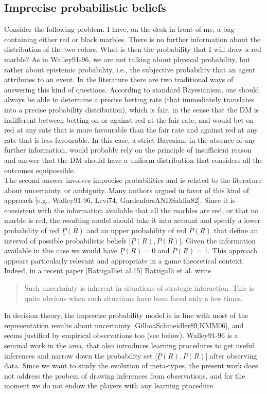 \documentclass[fleqn,reqno,11pt]{article}
\begin{document}
\subsection{Imprecise probabilistic beliefs}
\label{sec:impr-prob-beli}

Consider the following problem. I have, on the desk in front of me, a bag containing either red or black marbles. There is no further information about the distribution of the two colors. What is then the probability that I will draw a red marble? As in Walley91-96, we are not talking about physical probability, but rather about epistemic probability, i.e., the subjective probability that an agent attributes to an event.
In the literature there are two traditional ways of answering this kind of questions. According to standard Bayesianism, one should always be able to determine a precise betting rate (that immediately translates into a precise probability distribution), which is fair, in the sense that the DM is indifferent between betting on or against red at the fair rate, and would bet on red at any rate that is more favourable than the fair rate and against red at any rate that is less favourable. In this case, a strict Bayesian, in the absence of any further information, would probably rely on the principle of insufficient reason and answer that the DM should have a uniform distribution that considers all the outcomes equipossible. \\
The second answer involves imprecise probabilities and is related to the literature about uncertainty, or ambiguity. Many authors argued in favor of this kind of approach [e.g., Walley91-96, Levi74, GardenforsANDSahlin82]. Since it is consistent with the information available that all the marbles are red, or that no marble is red, the resulting model should take it into account and specify a lower probability of red $\underline{P}(R)$ and an upper probability of red $\overline{P}(R)$ that define an interval of possible probabilistic beliefs [$\underline{P}(R), \overline{P}(R)$]. Given the information available in this case we would have $\underline{P}(R)=0$ and $\overline{P}(R)=1$. This approach appears particularly relevant and appropriate in a game theoretical context. Indeed, in a recent paper [Battigalliet al.15] Battigalli et al. write
\begin{quote}
Such uncertainty is inherent in situations of strategic interaction. This is quite obvious when such situations have been faced only a few times.
\end{quote}
In decision theory, the imprecise probability model is in line with most of the representation results about uncertainty [GilboaSchmeidler89,KMM06], and seems justified by empirical observations too (see below). Walley91-96 is a seminal work in the area, that also introduces learning procedures to get useful inferences and narrow down the probability set [$\underline{P}(R), \overline{P}(R)$] after observing data. Since we want to study the evolution of meta-types, the present work does not address the probem of drawing inferences from observations, and for the moment we do not endow the players with any learning procedure.\\
\end{document}
